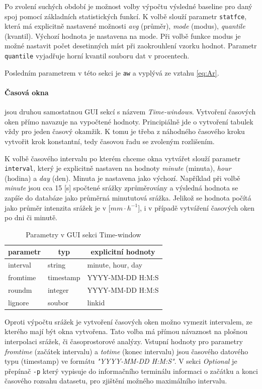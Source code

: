 \documentclass[a4paper,12pt,oneside]{report}
\begin{document}
Po zvolení suchých období je možnost volby výpočtu výsledné baseline pro daný spoj pomocí základních statistických funkcí. K volbě slouží parametr \texttt{statfce}, která má explicitně nastavené možnosti \emph{avg} (průměr), \emph{mode} (modus), \emph{quantile} (kvantil). Výchozí hodnota je nastavena na mode. Při volbě funkce modus je možné nastavit počet desetinných míst při zaokrouhlení vzorku hodnot. Parametr \texttt{quantile}  vyjadřuje horní kvantil souboru dat v procentech. 

Posledním parametrem v této sekci je \texttt{aw} a vyplývá ze vztahu \ref{eq:Ar}.


\paragraph*{Časová okna} jsou druhou samostatnou GUI sekcí s názvem \textit{Time-windows}. Vytvoření časových oken přímo navazuje na vypočtené hodnoty. Principiálně jde o vytvoření tabulek vždy pro jeden časový okamžik. K tomu je třeba z náhodného časového kroku vytvořit krok konstantní, tedy časovou řadu se zvoleným rozlišením.

K volbě časového intervalu po kterém chceme okna vytvářet slouží parametr \texttt{interval}, který je explicitně nastaven na hodnoty \emph{minute} (minuta), \emph{hour} (hodina) a \emph{day} (den). Minuta je nastavena jako výchozí.  Například při volbě \emph{minute} jsou cca 15 [s] spočtené srážky zprůměrovány a výsledná hodnota se zapíše do databáze jako průměrná minututová srážka. Jelikož se hodnota počítá jako průměr  intenzita srážek je v [$mm \cdot h^{-1}$], i v případě vytváření časových oken po dni či minutě.
\begin{table}[h]
\centering
\begin{tabular}{|lll|}
\hline
\multicolumn{1}{|c}{parametr} & \multicolumn{1}{c}{typ} & \multicolumn{1}{c|}{explicitní hodnoty} \\ \hline\hline
interval                               & string                  & minute, hour, day             \\
fromtime                               & timestamp               & YYYY-MM-DD H:M:S              \\
roundm                                 & integer                 & YYYY-MM-DD H:M:S              \\
lignore                                & soubor                  & linkid                        \\ \hline
\end{tabular}
\caption{Parametry v GUI sekci Time-window}
\label{my-label}
\end{table}
Oproti výpočtu srážek je vytvoření časových oken možno vymezit intervalem, ze kterého mají být okna vytvořena. Tato volba má přímou návaznost na plošnou interpolaci srážek, či časoprostorové analýzy. Vstupní hodnoty pro parametry \textit{fromtime} (začátek intervalu) a \textit{totime} (konec intervalu) jsou časového datového typu (timestamp) ve formátu \emph{"YYYY-MM-DD H:M:S"}. V sekci \textit{Optional} je přepínač \texttt{-p} který vypisuje do informačního terminálu informaci o začátku a konci časového rozsahu datasetu, pro zjištění možného maximálního intervalu.
\end{document}
